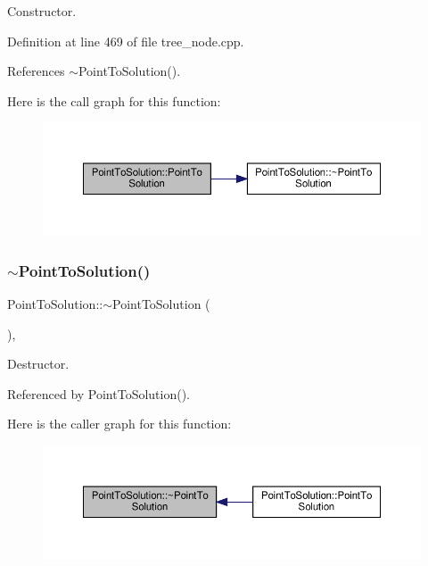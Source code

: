 Constructor. 



Definition at line 469 of file tree\+\_\+node.\+cpp.



References $\sim$\+Point\+To\+Solution().

Here is the call graph for this function\+:
\nopagebreak
\begin{figure}[H]
\begin{center}
\leavevmode
\includegraphics[width=350pt]{d8/dfc/structPointToSolution_a245e8221f21315da8cb550bac8842887_cgraph}
\end{center}
\end{figure}
\mbox{\label{structPointToSolution_ae7c6ebc74bd9faa820746e7536ac0230}} 
\subsubsection{\texorpdfstring{$\sim$\+Point\+To\+Solution()}{~PointToSolution()}}
{\footnotesize\ttfamily Point\+To\+Solution\+::$\sim$\+Point\+To\+Solution (\begin{DoxyParamCaption}{ }\end{DoxyParamCaption})\hspace{0.3cm}{\ttfamily [virtual]}, {\ttfamily [default]}}



Destructor. 



Referenced by Point\+To\+Solution().

Here is the caller graph for this function\+:
\nopagebreak
\begin{figure}[H]
\begin{center}
\leavevmode
\includegraphics[width=350pt]{d8/dfc/structPointToSolution_ae7c6ebc74bd9faa820746e7536ac0230_icgraph}
\end{center}
\end{figure}


